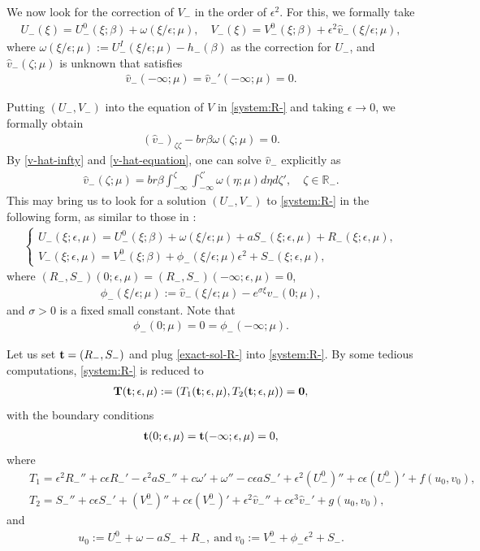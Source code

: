 \documentclass[11pt,a4paper]{article}
\numberwithin{equation}{section}
\numberwithin{figure}{section}
\newcommand\bt{{\bf t}}
\newcommand\bT{{\bf T}}
\newcommand\ep{\epsilon}
\newcommand\bea{\begin{eqnarray}}
\newcommand\eea{\end{eqnarray}}
\newcommand\beaa{\begin{eqnarray*}}
\newcommand\eeaa{\end{eqnarray*}}
\begin{document}
We now look for the correction of $V_-$ in the order of $\epsilon^2$. For this, we formally take
\beaa
U_-(\xi)=U^0_{-}(\xi;\beta)+\omega(\xi/\ep;\mu),\quad V_-(\xi)=V^0_{-}(\xi;\beta)+\epsilon^2 \hat{v}_-(\xi/\epsilon;\mu),
\eeaa
where $\omega(\xi/\epsilon;\mu):=U_-^{I}(\xi/\epsilon;\mu)-h_-(\beta)$ as the correction for $U_-$, and $\hat{v}_-(\zeta;\mu)$ is unknown that satisfies
\bea\label{v-hat-infty}
\hat{v}_-(-\infty;\mu)=\hat{v}_{-}'(-\infty;\mu)=0.
\eea

Putting $(U_-,V_-)$ into the equation of $V$ in \eqref{system:R-} and taking $\epsilon\to0$, we formally obtain
\bea\label{v-hat-equation}
(\hat{v}_-)_{\zeta\zeta}-br\beta\omega(\zeta;\mu)=0.
\eea
By \eqref{v-hat-infty} and \eqref{v-hat-equation}, one can solve $\hat{v}_-$ explicitly as
\beaa%
\hat{v}_-(\zeta;\mu)=br\beta\int_{-\infty}^{\zeta}\int_{-\infty}^{\zeta'}\omega(\eta;\mu)d\eta d\zeta',\quad \zeta\in \mathbb{R}_-.
\eeaa
This may bring us to look for a solution $(U_{-}, V_{-})$ to \eqref{system:R-} in the following form, as similar to those in \cite{Hosono 2003, Hosono Mimura 1982}:
\bea\label{exact-sol-R-}
\begin{cases}
 U_{-}(\xi;\ep,\mu)=U^0_{-}(\xi;\beta)+\omega(\xi/\epsilon;\mu)+aS_-(\xi;\epsilon,\mu)+R_-(\xi;\epsilon,\mu),\\
 V_{-}(\xi;\ep,\mu)=V^0_{-}(\xi;\beta)+\phi_-(\xi/\ep;\mu)\epsilon^2+S_-(\xi;\epsilon,\mu),
\end{cases}
\eea
where $(R_-,S_-)(0;\epsilon,\mu)=(R_-,S_-)(-\infty;\epsilon,\mu)=0$,
\beaa
\phi_-(\xi/\ep;\mu):=\hat{v}_-(\xi/\epsilon;\mu)-e^{\sigma \xi}\hat{v}_-(0;\mu),
\eeaa
and $\sigma>0$ is a fixed small constant. Note that
\beaa
\phi_-(0;\mu)=0=\phi_-(-\infty;\mu).
\eeaa



Let us set $\bt=(R_-,S_-)$ and plug \eqref{exact-sol-R-} into \eqref{system:R-}.
By some tedious computations, \eqref{system:R-} is reduced to 
\bea\label{Operator T}
\bT(\bt;\epsilon,\mu):=(T_1(\bt;\epsilon,\mu), T_2(\bt;\epsilon,\mu))
={\bf0},
\eea
with the boundary conditions
\bea\label{T-BCs}
\bt(0;\epsilon,\mu)=\bt(-\infty;\epsilon,\mu)=0,
\eea
where
\beaa
&&T_1=\ep^2R_{-}''+c\ep R_{-}'-\ep^2aS_{-}''+c\omega'+\omega''-c\ep a S_{-}'+\ep^2(U_{-}^0)''+c\ep (U_{-}^0)'+f({u}_0,{v}_0),\\
&&T_2=S_{-}''+c\ep S_{-}'+(V_{-}^0)''+c\ep (V_{-}^0)'+\ep^2 \hat{v}_{-}''+c\ep^3\hat{v}_{-}'+g({u}_0,{v}_0),
\eeaa
and
\bea\label{u0v0}
u_0:=U_{-}^0+\omega-aS_-+R_{-},\ \mbox{and}\ v_0:=V_{-}^0+\phi_{-}\ep^2+S_{-}.
\eea
\end{document}
